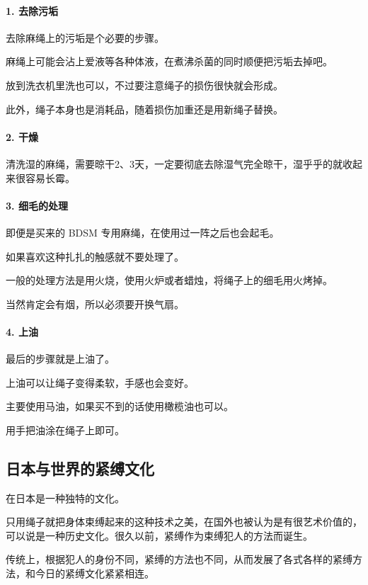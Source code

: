 \documentclass[12pt,UTF8]{ctexbook}
\begin{document}
\paragraph{1. 去除污垢}

去除麻绳上的污垢是个必要的步骤。

麻绳上可能会沾上爱液等各种体液，在煮沸杀菌的同时顺便把污垢去掉吧。

放到洗衣机里洗也可以，不过要注意绳子的损伤很快就会形成。

此外，绳子本身也是消耗品，随着损伤加重还是用新绳子替换。

\paragraph{2. 干燥}

清洗湿的麻绳，需要晾干2、3天，一定要彻底去除湿气完全晾干，湿乎乎的就收起来很容易长霉。

\paragraph{3. 细毛的处理}

即便是买来的 BDSM 专用麻绳，在使用过一阵之后也会起毛。

如果喜欢这种扎扎的触感就不要处理了。

一般的处理方法是用火烧，使用火炉或者蜡烛，将绳子上的细毛用火烤掉。

当然肯定会有烟，所以必须要开换气扇。

\paragraph{4. 上油}

最后的步骤就是上油了。

上油可以让绳子变得柔软，手感也会变好。

主要使用马油，如果买不到的话使用橄榄油也可以。

用手把油涂在绳子上即可。

\subsection{日本与世界的紧缚文化}

在日本是一种独特的文化。

只用绳子就把身体束缚起来的这种技术之美，在国外也被认为是有很艺术价值的，可以说是一种历史文化。很久以前，紧缚作为束缚犯人的方法而诞生。

传统上，根据犯人的身份不同，紧缚的方法也不同，从而发展了各式各样的紧缚方法，和今日的紧缚文化紧紧相连。
\end{document}
